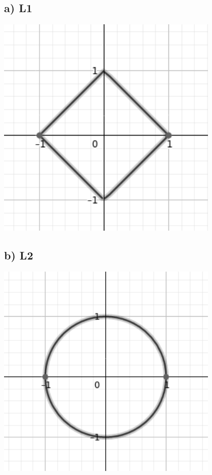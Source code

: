\documentclass{article}
\begin{document}
\vspace{1cm}
\begin{minipage}{.44\textwidth}
    \subsection*{a) L1}
    \includegraphics[width=0.8\textwidth]{img/norm_l1.png}
\end{minipage}
\begin{minipage}{.44\textwidth}
    \subsection*{b) L2}
    \includegraphics[width=0.8\textwidth]{img/norm_l2.png}
\end{minipage}
\end{document}
